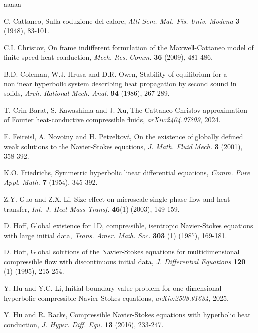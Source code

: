 \documentclass[11pt,reqno]{amsart}
\numberwithin{equation}{section}
\begin{document}
\begin{thebibliography}{aaaaa}

   C. Cattaneo, Sulla coduzione del calore,  \textit{Atti Sem. Mat. Fis. Univ. Modena} \textbf{3} (1948), 83-101.


  C.I. Christov, On frame indifferent formulation of the Maxwell-Cattaneo model of finite-speed heat conduction, {\it Mech. Res. Comm.}  {\bf 36} (2009), 481-486.


 B.D. Coleman, W.J. Hrusa and D.R. Owen, Stability of equilibrium for a nonlinear hyperbolic system describing heat propagation by second sound in solids, \textit{ Arch. Rational Mech. Anal.} \textbf{94} (1986), 267-289.

 T. Crin-Barat, S. Kawashima and J. Xu, The Cattaneo-Christov approximation of Fourier heat-conductive compressible fluids, \textit{arXiv:2404.07809}, 2024.

  E. Feireisl, A. Novotny and H. Petzeltov\'{a}, On the existence of globally defined weak solutions to
the Navier-Stokes equations, \textit{J. Math. Fluid Mech.} \textbf{3} (2001), 358-392.

  K.O. Friedrichs, Symmetric hyperbolic linear differential equations,  {\it Comm. Pure Appl. Math.} {\bf 7} (1954), 345-392.


 Z.Y. Guo and Z.X. Li, Size effect on microscale single-phase flow and heat transfer, \textit{Int. J. Heat Mass Transf.} \textbf{46}(1) (2003), 149-159.

 D. Hoff, Global existence for 1D, compressible, isentropic Navier-Stokes equations
with large initial data, \textit{Trans. Amer. Math. Soc.} \textbf{303} (1) (1987), 169-181.

 D. Hoff, Global solutions of the Navier-Stokes equations for multidimensional compressible
flow with discontinuous initial data, \textit{J. Differential Equations} \textbf{120} (1) (1995), 215-254.

 Y. Hu and Y.C. Li, Initial boundary value problem for one-dimensional hyperbolic compressible Navier-Stokes equations, \textit{arXiv:2508.01634}, 2025.

 Y. Hu and R. Racke, Compressible Navier-Stokes equations with hyperbolic heat
conduction, \textit{J. Hyper. Diff. Equ.} \textbf{13} (2016), 233-247.



\end{thebibliography}
\end{document}
